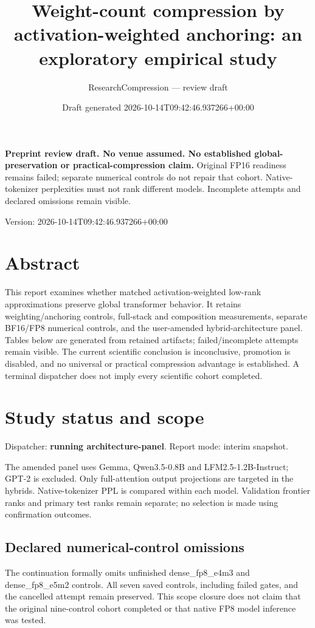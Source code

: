 \documentclass[10pt]{article}
\title{Weight-count compression by activation-weighted anchoring: an exploratory empirical study}
\author{ResearchCompression --- review draft}
\date{Draft generated 2026-10-14T09:42:46.937266+00:00}
\begin{document}
\maketitle
\noindent\textbf{Preprint review draft. No venue assumed. No established global-preservation or practical-compression claim.}
Original FP16 readiness remains failed; separate numerical controls do not repair that cohort. Native-tokenizer perplexities must not rank different models. Incomplete attempts and declared omissions remain visible.


Version: 2026-10-14T09:42:46.937266+00:00

\section{Abstract}

This report examines whether matched activation-weighted low-rank approximations preserve global transformer behavior. It retains weighting/anchoring controls, full-stack and composition measurements, separate BF16/FP8 numerical controls, and the user-amended hybrid-architecture panel. Tables below are generated from retained artifacts; failed/incomplete attempts remain visible. The current scientific conclusion is inconclusive, promotion is disabled, and no universal or practical compression advantage is established. A terminal dispatcher does not imply every scientific cohort completed.

\section{Study status and scope}

Dispatcher: \textbf{running architecture-panel}. Report mode: interim snapshot.

The amended panel uses Gemma, Qwen3.5-0.8B and LFM2.5-1.2B-Instruct; GPT-2 is excluded. Only full-attention output projections are targeted in the hybrids. Native-tokenizer PPL is compared within each model. Validation frontier ranks and primary test ranks remain separate; no selection is made using confirmation outcomes.

\subsection{Declared numerical-control omissions}

The continuation formally omits unfinished dense\_fp8\_e4m3 and dense\_fp8\_e5m2 controls. All seven saved controls, including failed gates, and the cancelled attempt remain preserved. This scope closure does not claim that the original nine-control cohort completed or that native FP8 model inference was tested.
\end{document}
